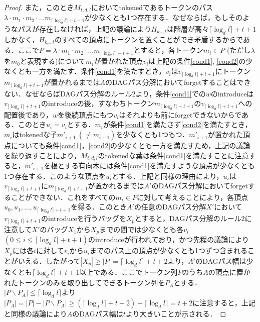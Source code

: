 \documentclass[master]{kuisthesis}		%
\theoremstyle{plain}
\theoremstyle{definition}
\begin{document}
\begin{proof}
また，このとき$M_{t, d, l}$においてtokenedであるトークンのパス$\lambda \cdot m_1 \cdot m_2 \cdot \dots m_{\lceil \log_d l \rceil +t+1}$が少なくとも1つ存在する．なぜならば，もしそのようなパスが存在しなければ，上記の議論により$H_{k_{r'}, t}$は階層が高々$\lceil \log_d l \rceil +t+1$しかなく，$H_{k_{r'}, t}$のすべての頂点にトークンを置くことができ矛盾するからである．ここで$P = \lambda \cdot m_1 \cdot m_2 \cdot \dots m_{\lceil \log_d l \rceil +t+1}$とすると，各トークン$m_i \in P$ (ただし$\lambda$を$m_0$と表現する)について$m_i$が置かれた頂点$v_i$は上記の条件\ref{cond1}, \ref{cond2}の少なくとも一方を満たす．条件\ref{cond1}を満たすとき，$v_i$は$v_{\lceil \log_d l \rceil +t+1}$にトークン$m_{\lceil \log_d l \rceil +t+1}$が置かれるまでは$A$のDAGパス分解においてforgetすることはできない．なぜならばDAGパス分解のルール2より，条件\ref{cond1}での$w$のintroduceは$v_{\lceil \log_d l \rceil +t+1}$のintroduceの後，すなわちトークン$m_{\lceil \log_d l \rceil +t+1}$の$v_{\lceil \log_d l \rceil +t+1}$への配置後であり，$w$を後続頂点にもつ$v_i$はそれよりも前にforgetできないからである．このとき$u_i=v_i$とする．$m_i$が条件\ref{cond1}を満たさず\ref{cond2}を満たすとき，$m_i$はtokenedな子$m'_{i+1}\ (\neq m_{i+1})$を少なくとも1つもつ．$m'_{i+1}$が置かれた頂点についても条件\ref{cond1}，\ref{cond2}の少なくとも一方を満たすため，上記の議論を繰り返すことにより，$M_{t, d, l}$のtokenedな葉は条件\ref{cond1}を満たすことに注意すると，$m'_{i+1}$を根とする有向木には条件\ref{cond1}を満たすような頂点が少なくとも1つ存在する．このような頂点を$u_i$とする．上記と同様の理由により，$u_i$は$v_{\lceil \log_d l \rceil +t+1}$に$m_{\lceil \log_d l \rceil +t+1}$が置かれるまでは$A'$のDAGパス分解においてforgetすることができない．これをすべての$m_i \in P$に対して考えることにより，各頂点$u_0, u_1, \dots, u_{\lceil \log_d l \rceil +t+1}$を得る．このとき$A'$の任意のDAGパス分解$X'$において$v_{\lceil \log_d l \rceil +t+1}$のintroduceを行うバッグを$X_p$とすると，DAGパス分解のルール2に注意して$X'$のバッグ$X_1$から$X_p$までの間では少なくとも各$v_i$ $(0 \leq i \leq \lceil \log_d l \rceil +t+1)$のintroduceが行われており，かつ先程の議論により$X_p$には各$i$に対して$v_i$から$u_i$までのパス上の頂点が少なくとも1つずつ含まれることがいえる．したがって$|X_p| \geq |P| = \lceil \log_d l \rceil +t+2$より，$A'$のDAGパス幅は少なくとも$\lceil \log_d l \rceil +t+1$以上である．ここでトークン列$P$のうち$A$の頂点に置かれたトークンのみを取り出してできるトークン列を$P_A$とする．$|P \backslash P_A| \leq \lceil \log_d l \rceil$より$|P_A| = |P| - |P \backslash P_A| \geq (\lceil \log_d l \rceil +t+2) - \lceil \log_d l \rceil = t+2$に注意すると，上記と同様の議論により$A$のDAGパス幅は$t$より大きいことが示される．
\end{proof}
\end{document}
